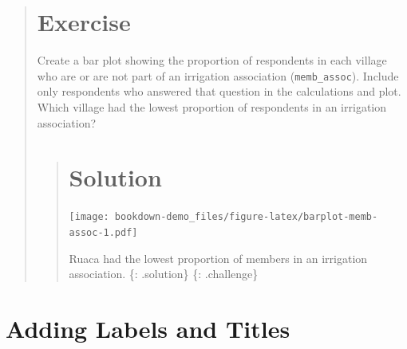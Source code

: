 \documentclass[]{book}
\newenvironment{Shaded}{\begin{snugshade}}{\end{snugshade}}
\newcommand{\KeywordTok}[1]{\textcolor[rgb]{0.13,0.29,0.53}{\textbf{#1}}}
\newcommand{\DataTypeTok}[1]{\textcolor[rgb]{0.13,0.29,0.53}{#1}}
\newcommand{\StringTok}[1]{\textcolor[rgb]{0.31,0.60,0.02}{#1}}
\newcommand{\OperatorTok}[1]{\textcolor[rgb]{0.81,0.36,0.00}{\textbf{#1}}}
\newcommand{\NormalTok}[1]{#1}
\begin{document}
\begin{quote}
\section{Exercise}\label{exercise-14}

Create a bar plot showing the proportion of respondents in each village
who are or are not part of an irrigation association
(\texttt{memb\_assoc}). Include only respondents who answered that
question in the calculations and plot. Which village had the lowest
proportion of respondents in an irrigation association?

\begin{quote}
\section{Solution}\label{solution-20}

\begin{Shaded}
\end{Shaded}

\texttt{[image: bookdown-demo\_files/figure-latex/barplot-memb-assoc-1.pdf]}

Ruaca had the lowest proportion of members in an irrigation association.
\{: .solution\} \{: .challenge\}
\end{quote}
\end{quote}

\section{Adding Labels and Titles}\label{adding-labels-and-titles}
\end{document}
